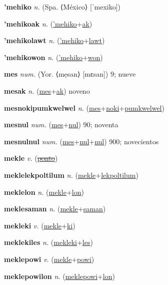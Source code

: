 \textbf{\hypertarget{'mehiko}{'mehiko}} \textit{n.} (Spa. ⟨México⟩ [ˈmexiko])


\textbf{\hypertarget{'mehikoak}{'mehikoak}} \textit{n.} (\hyperlink{'mehiko}{'mehiko}+\allowbreak \hyperlink{ak}{ak})


\textbf{\hypertarget{'mehikolawt}{'mehikolawt}} \textit{n.} (\hyperlink{'mehiko}{'mehiko}+\allowbreak \hyperlink{lawt}{lawt})


\textbf{\hypertarget{'mehikowon}{'mehikowon}} \textit{n.} (\hyperlink{'mehiko}{'mehiko}+\allowbreak \hyperlink{won}{won})


\textbf{\hypertarget{mes}{mes}} \textit{num.} (Yor. ⟨mẹsan⟩ [mɛsan])
9; nueve

\textbf{\hypertarget{mesak}{mesak}} \textit{n.} (\hyperlink{mes}{mes}+\allowbreak \hyperlink{ak}{ak})
noveno

\textbf{\hypertarget{mesnokipumkwelwel}{mesnokipumkwelwel}} \textit{n.} (\hyperlink{mes}{mes}+\allowbreak \hyperlink{noki}{noki}+\allowbreak \hyperlink{pumkwelwel}{pumkwelwel})


\textbf{\hypertarget{mesnul}{mesnul}} \textit{num.} (\hyperlink{mes}{mes}+\allowbreak \hyperlink{nul}{nul})
90; noventa

\textbf{\hypertarget{mesnulnul}{mesnulnul}} \textit{num.} (\hyperlink{mes}{mes}+\allowbreak \hyperlink{nul}{nul}+\allowbreak \hyperlink{nul}{nul})
900; novecientos

\textbf{\hypertarget{mekle}{mekle}} \textit{v.} (\hyperlink{ponto}{\sout{ponto}})


\textbf{\hypertarget{meklelekpoltilum}{meklelekpoltilum}} \textit{n.} (\hyperlink{mekle}{mekle}+\allowbreak \hyperlink{lekpoltilum}{lekpoltilum})


\textbf{\hypertarget{meklelon}{meklelon}} \textit{n.} (\hyperlink{mekle}{mekle}+\allowbreak \hyperlink{lon}{lon})


\textbf{\hypertarget{meklesaman}{meklesaman}} \textit{n.} (\hyperlink{mekle}{mekle}+\allowbreak \hyperlink{saman}{saman})


\textbf{\hypertarget{mekleki}{mekleki}} \textit{v.} (\hyperlink{mekle}{mekle}+\allowbreak \hyperlink{ki}{ki})


\textbf{\hypertarget{meklekiles}{meklekiles}} \textit{n.} (\hyperlink{mekleki}{mekleki}+\allowbreak \hyperlink{les}{les})


\textbf{\hypertarget{meklepowi}{meklepowi}} \textit{v.} (\hyperlink{mekle}{mekle}+\allowbreak \hyperlink{powi}{powi})


\textbf{\hypertarget{meklepowilon}{meklepowilon}} \textit{n.} (\hyperlink{meklepowi}{meklepowi}+\allowbreak \hyperlink{lon}{lon})


